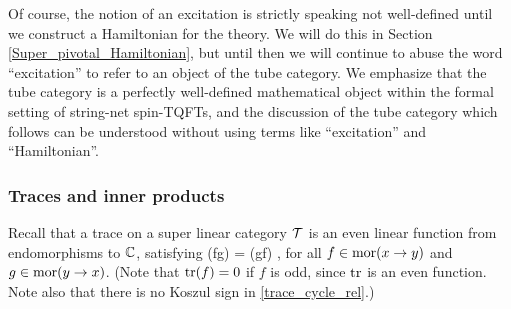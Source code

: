 Of course, the notion of an excitation is strictly speaking not well-defined until we construct a Hamiltonian for the theory.
We will do this in Section \ref{Super_pivotal_Hamiltonian}, but until then we will continue to abuse the word ``excitation''
to refer to an object of the tube category. 
We emphasize that the tube category is a perfectly well-defined mathematical object within 
the formal setting of string-net spin-TQFTs, and the discussion of the tube category 
which follows can be understood without using terms like ``excitation'' and ``Hamiltonian''. 



\subsubsection{Traces and inner products} \label{traces_and_innerproducts}


Recall that a trace on a super linear category $\mathcal{T}$
is an even linear function from endomorphisms to $\mathbb{C}$, satisfying
\be  \label{trace_cycle_rel}
	\tr(fg) = \tr(gf) ,
\ee
for all $f \in \text{mor}(x\to y)$ and $g\in \text{mor}(y\to x)$.
(Note that $\text{tr}(f) = 0$ if $f$ is odd, since $\text{tr}$ is an even function.
Note also that there is no Koszul sign in \eqref{trace_cycle_rel}.)

